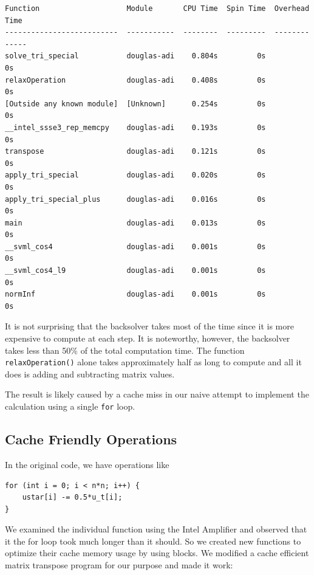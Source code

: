 \documentclass[a4paper,11pt]{article}
\begin{document}
\begin{minipage}{\textwidth}
	\begin{framed}
		\begin{center}
			\begin{verbatim}
Function                    Module       CPU Time  Spin Time  Overhead Time
--------------------------  -----------  --------  ---------  -------------
solve_tri_special           douglas-adi    0.804s         0s             0s
relaxOperation              douglas-adi    0.408s         0s             0s
[Outside any known module]  [Unknown]      0.254s         0s             0s
__intel_ssse3_rep_memcpy    douglas-adi    0.193s         0s             0s
transpose                   douglas-adi    0.121s         0s             0s
apply_tri_special           douglas-adi    0.020s         0s             0s
apply_tri_special_plus      douglas-adi    0.016s         0s             0s
main                        douglas-adi    0.013s         0s             0s
__svml_cos4                 douglas-adi    0.001s         0s             0s
__svml_cos4_l9              douglas-adi    0.001s         0s             0s
normInf                     douglas-adi    0.001s         0s             0s
			\end{verbatim}	
		\end{center}
	\end{framed}
\end{minipage}
\begin{multicols}{2}
	 It is not surprising that the backsolver takes most of the time since it is more expensive to compute at each step. It is noteworthy, however, the backsolver takes less than 50\% of the total computation time. The function \verb|relaxOperation()| alone takes approximately half as long to compute and all it does is adding and subtracting matrix values.
\par The result is likely caused by a cache miss in our naive attempt to implement the calculation using a single \verb|for| loop.
	\subsection{Cache Friendly Operations}
	In the original code, we have operations like
\begin{framed}	
	\begin{verbatim}
for (int i = 0; i < n*n; i++) {
	ustar[i] -= 0.5*u_t[i];
}
	\end{verbatim}
\end{framed}
	We examined the individual function using the Intel Amplifier and observed that it the for loop took much longer than it should. So we created new functions to optimize their cache memory usage by using blocks. We modified a cache efficient matrix transpose program for our purpose and made it work:
\end{multicols}
\end{document}
